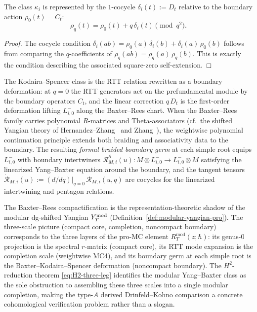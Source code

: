 \begin{proposition}
\label{prop:yangian-baxter-KS-cocycle}
The class $\kappa_i$ is represented by the $1$-cocycle
$\delta_i(t) := D_t$ relative to the boundary action
$\rho_0(t) = C_t$:
\begin{equation}\label{eq:baxter-KS-cocycle}
 \rho_q(t) = \rho_0(t) + q\,\delta_i(t) \pmod{q^2}.
\end{equation}
\end{proposition}

\begin{proof}
The cocycle condition
$\delta_i(ab) = \rho_0(a)\,\delta_i(b) + \delta_i(a)\,\rho_0(b)$
follows from comparing the $q$-coefficients of
$\rho_q(ab) = \rho_q(a)\,\rho_q(b)$. This is exactly the condition
describing the associated square-zero self-extension.
\end{proof}

The Kodaira--Spencer class is the RTT relation rewritten as a
boundary deformation: at $q = 0$ the RTT generators act on the
prefundamental module by the boundary operators $C_t$, and the linear
correction $q\,D_t$ is the first-order deformation lifting $L^-_{i,0}$
along the Baxter--Rees chart. When the Baxter--Rees family carries
polynomial $R$-matrices and Theta-associators (cf.\ the shifted Yangian
theory of Hernandez--Zhang~\cite{HZ24} and Zhang~\cite{ZhangTheta24}),
the weightwise polynomial continuation principle extends both braiding
and associativity data to the boundary. The resulting \emph{formal
braided boundary germ} at each simple root equips $L^-_{i,0}$ with
boundary intertwiners
$\mathscr{R}_{M,i}^{\partial}(u) \colon M \otimes L^-_{i,0} \to
L^-_{i,0} \otimes M$ satisfying the linearized Yang--Baxter equation
around the boundary, and the tangent tensors
$\dot{\mathscr{R}}_{M,i}(u) := (d/dq)|_{q=0}\,\mathscr{R}_{M,i}(u,q)$
are cocycles for the linearized intertwining and pentagon relations.

\begin{remark}
\label{rem:yangian-baxter-rees-modular}
The Baxter--Rees compactification is the representation-theoretic
shadow of the modular dg-shifted Yangian $Y^{\mathrm{mod}}_T$
(Definition~\ref{def:modular-yangian-pro}). The three-scale picture
(compact core, completion, noncompact boundary) corresponds to
the three layers of the pro-MC element $R_T^{\mathrm{mod}}(z;\hbar)$:
its genus-$0$ projection is the spectral $r$-matrix (compact core),
its RTT mode expansion is the completion scale (weightwise MC4), and
its boundary germ at each simple root is the Baxter--Kodaira--Spencer
deformation (noncompact boundary). The $H^2$-reduction theorem
\eqref{eq:H2-three-leg} identifies the modular Yang--Baxter class as
the sole obstruction to assembling these three scales into a single
modular completion, making the type-$A$ derived Drinfeld--Kohno
comparison a concrete cohomological verification problem rather
than a slogan.
\end{remark}

